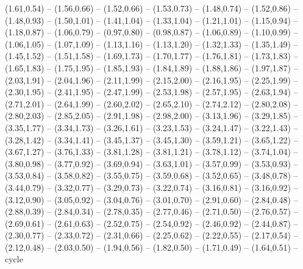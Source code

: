 \expandafter\def\csname geo:gebiet:heute-CHE\endcsname{
  (1.61,0.54) -- (1.56,0.66) -- (1.52,0.66) -- (1.53,0.73) -- (1.48,0.74) -- (1.52,0.86) -- (1.48,0.93) -- (1.50,1.01) -- (1.41,1.04) -- (1.33,1.04) -- (1.21,1.01) -- (1.15,0.94) -- (1.18,0.87) -- (1.06,0.79) -- (0.97,0.80) -- (0.98,0.87) -- (1.06,0.89) -- (1.10,0.99) -- (1.06,1.05) -- (1.07,1.09) -- (1.13,1.16) -- (1.13,1.20) -- (1.32,1.33) -- (1.35,1.49) -- (1.45,1.52) -- (1.51,1.58) -- (1.69,1.73) -- (1.70,1.77) -- (1.76,1.81) -- (1.73,1.83) -- (1.65,1.83) -- (1.75,1.95) -- (1.85,1.93) -- (1.84,1.89) -- (1.88,1.86) -- (1.97,1.87) -- (2.03,1.91) -- (2.04,1.96) -- (2.11,1.99) -- (2.15,2.00) -- (2.16,1.95) -- (2.25,1.99) -- (2.30,1.95) -- (2.41,1.95) -- (2.47,1.99) -- (2.53,1.98) -- (2.57,1.95) -- (2.63,1.94) -- (2.71,2.01) -- (2.64,1.99) -- (2.60,2.02) -- (2.65,2.10) -- (2.74,2.12) -- (2.80,2.08) -- (2.80,2.03) -- (2.85,2.05) -- (2.91,1.98) -- (2.98,2.00) -- (3.13,1.96) -- (3.29,1.85) -- (3.35,1.77) -- (3.34,1.73) -- (3.26,1.61) -- (3.23,1.53) -- (3.24,1.47) -- (3.22,1.43) -- (3.28,1.42) -- (3.34,1.41) -- (3.45,1.37) -- (3.45,1.30) -- (3.59,1.21) -- (3.65,1.22) -- (3.67,1.27) -- (3.76,1.33) -- (3.81,1.28) -- (3.81,1.21) -- (3.78,1.12) -- (3.74,1.04) -- (3.80,0.98) -- (3.77,0.92) -- (3.69,0.94) -- (3.63,1.01) -- (3.57,0.99) -- (3.53,0.93) -- (3.53,0.84) -- (3.58,0.82) -- (3.55,0.75) -- (3.59,0.68) -- (3.52,0.65) -- (3.48,0.78) -- (3.44,0.79) -- (3.32,0.77) -- (3.29,0.73) -- (3.22,0.74) -- (3.16,0.81) -- (3.16,0.92) -- (3.12,0.90) -- (3.05,0.92) -- (3.04,0.76) -- (3.01,0.70) -- (2.91,0.60) -- (2.84,0.48) -- (2.88,0.39) -- (2.84,0.34) -- (2.78,0.35) -- (2.77,0.46) -- (2.71,0.50) -- (2.76,0.57) -- (2.69,0.61) -- (2.61,0.63) -- (2.52,0.75) -- (2.54,0.92) -- (2.46,0.92) -- (2.44,0.87) -- (2.30,0.77) -- (2.33,0.72) -- (2.31,0.66) -- (2.25,0.62) -- (2.22,0.55) -- (2.17,0.54) -- (2.12,0.48) -- (2.03,0.50) -- (1.94,0.56) -- (1.82,0.50) -- (1.71,0.49) -- (1.64,0.51) -- cycle}
